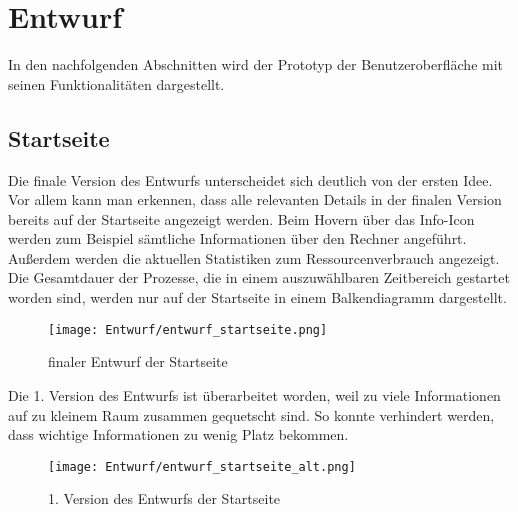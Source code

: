 \documentclass{report}
\begin{document}
\section{Entwurf}
In den nachfolgenden Abschnitten wird der Prototyp der Benutzeroberfläche mit seinen Funktionalitäten dargestellt.
\subsection{Startseite}
Die finale Version des Entwurfs unterscheidet sich deutlich von der ersten Idee. Vor allem kann man erkennen, dass alle relevanten Details in der finalen Version bereits auf der Startseite angezeigt werden. Beim Hovern über das Info-Icon werden zum Beispiel sämtliche Informationen über den Rechner angeführt. Außerdem werden die aktuellen Statistiken zum Ressourcenverbrauch angezeigt.
Die Gesamtdauer der Prozesse, die in einem auszuwählbaren Zeitbereich gestartet worden sind, werden nur auf der Startseite in einem Balkendiagramm dargestellt.
\begin{figure}[H]
    \centering
    \texttt{[image: Entwurf/entwurf\_startseite.png]}
    \caption{finaler Entwurf der Startseite}
\end{figure}
\noindent Die 1. Version des Entwurfs ist überarbeitet worden, weil zu viele Informationen auf zu kleinem Raum zusammen gequetscht sind. So konnte verhindert werden, dass wichtige Informationen zu wenig Platz bekommen.
\begin{figure}[H]
    \centering
    \texttt{[image: Entwurf/entwurf\_startseite\_alt.png]}
    \caption{1. Version des Entwurfs der Startseite}
\end{figure}
\end{document}
